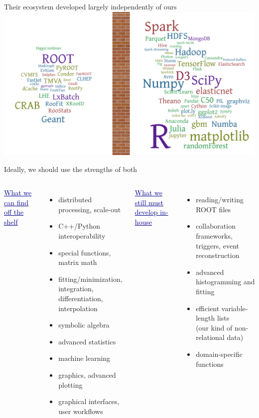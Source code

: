 \documentclass[aspectratio=169]{beamer}
\begin{document}
\begin{frame}{Their ecosystem developed largely independently of ours}
\vspace{0.17 cm}
\includegraphics[width=\linewidth]{separation-2.png}
\end{frame}

\begin{frame}{Ideally, we should use the strengths of both}
\vspace{0.5 cm}
\large
\begin{columns}[t]
\textcolor{darkblue}{\underline{What we can find off the shelf}}

\vspace{0.1 cm}
\begin{itemize}\setlength{\itemsep}{0.1 cm}
\item distributed processing, scale-out
\item C++/Python interoperability
\item special functions, matrix math
\item fitting/minimization, integration, differentiation, interpolation
\item symbolic algebra
\item advanced statistics
\item machine learning
\item graphics, advanced plotting
\item graphical interfaces, user workflows
\end{itemize}

\textcolor{darkblue}{\underline{What we still must develop in-house}}

\vspace{0.1 cm}
\begin{itemize}\setlength{\itemsep}{0.1 cm}
\item reading/writing ROOT files
\item collaboration frameworks, triggers, event reconstruction
\item advanced histogramming and fitting
\item efficient variable-length lists \\ (our kind of non-relational data)
\item domain-specific functions
\end{itemize}
\end{columns}
\end{frame}
\end{document}
